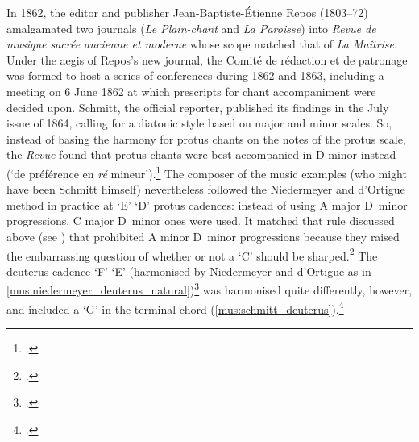 %
In 1862, the editor and publisher Jean-Baptiste-Étienne Repos (1803--72) amalgamated two journals (\emph{Le Plain-chant} and \emph{La Paroisse}) into \textit{Revue de musique sacrée ancienne et moderne} whose scope matched that of \emph{La Maîtrise}.
Under the aegis of Repos's new journal, the Comité de rédaction et de patronage was formed to host a series of conferences during 1862 and 1863, including a meeting on 6 June 1862 at which prescripts for chant accompaniment were decided upon.
Schmitt, the official reporter, published its findings in the July issue of 1864, calling for a diatonic style based on major and minor scales.
So, instead of basing the harmony for protus chants on the notes of the protus scale, the \emph{Revue} found that protus chants were best accompanied in D minor instead (`de préférence en \emph{ré} mineur').\footcite[cols~280--81, ]{SchmittRapportconferencesouvertes1864}
The composer of the music examples (who might have been Schmitt himself) nevertheless followed the Niedermeyer and d'Ortigue method in practice at `E' \rightarrow{} `D' protus cadences: instead of using A major \rightarrow{} D~minor progressions, C major \rightarrow{} D~minor ones were used.
It matched that rule discussed above (see ) that prohibited A minor \rightarrow{} D~minor progressions because they raised the embarrassing question of whether or not a `C' should be sharped.\footcites[Also discussed in][190--2]{LessmannRezeptiongregorianischenChorals2016}[Henri Potiron, whom we shall encounter below, offered an alternative view on a similar progression in the next century, this in an accompaniment manual that viewed chant accompaniment through a contrapuntal lens---disjunct motion was said to be preferable to conjunct motion. See][92]{PotironPetittraitecontrepoint1951}
The deuterus cadence `F' \rightarrow{} `E' (harmonised by Niedermeyer and d'Ortigue as in \cref{mus:niedermeyer_deuterus_natural})\footcite[42--4, 66]{NiedermeyerTraitetheoriquepratique1859} was harmonised quite differently, however, and included a `G'\kern 1pt\sharp{} in the terminal chord (\cref{mus:schmitt_deuterus}).\footcite[3, 5]{Schmittplainchantaccompagneselon1864}

